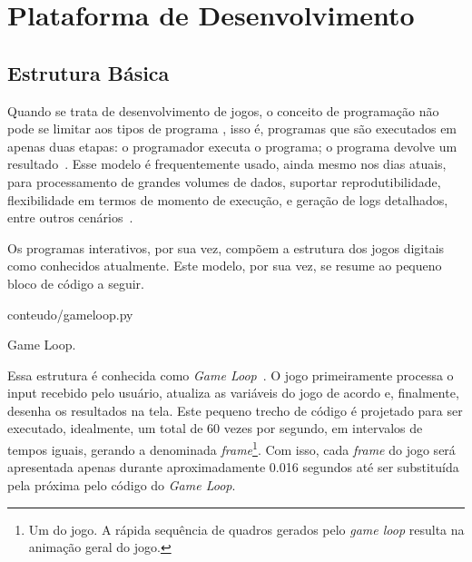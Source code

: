 
\chapter{Plataforma de Desenvolvimento}
\label{cap:plataforma de desenvolvimento}
\section{Estrutura Básica}

Quando se trata de desenvolvimento de jogos, o conceito de programação não pode se limitar aos tipos de programa \textquotedbl{}, isso é, programas que são executados em apenas duas etapas: o programador executa o programa; o programa devolve um resultado~\citep{IAEmTowerDefense}. Esse modelo é frequentemente usado, ainda mesmo nos dias atuais, para processamento de grandes volumes de dados, suportar reprodutibilidade, flexibilidade em termos de momento de execução, e geração de logs detalhados, entre outros cenários~\citep{BatchProgramming}.

Os programas interativos, por sua vez, compõem a estrutura dos jogos digitais como conhecidos atualmente. Este modelo, por sua vez, se resume ao pequeno bloco de código a seguir.

\begin{program}
    
    {conteudo/gameloop.py}
  
    \caption{Game Loop\label{prog:gameloop}.}
\end{program}

Essa estrutura é conhecida como \textit{Game Loop}~\citep{GameProgramming}. O jogo primeiramente processa o input recebido pelo usuário, atualiza as variáveis do jogo de acordo e, finalmente, desenha os resultados na tela. Este pequeno trecho de código é projetado para ser executado, idealmente, um total de 60 vezes por segundo, em intervalos de tempos iguais, gerando a denominada \textit{frame}\footnote{
    Um \textquotedbl{} do jogo. A rápida sequência de quadros gerados pelo \textit{game loop} resulta na animação geral do jogo.
}. Com isso, cada \textit{frame} do jogo será apresentada apenas durante aproximadamente 0.016 segundos até ser substituída pela próxima pelo código do \textit{Game Loop}.

